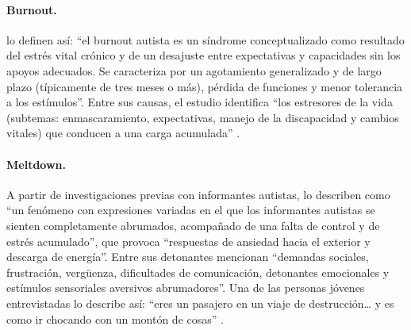\paragraph{Burnout.} \citet{raymaker2020} lo definen así: \enquote{el burnout autista es un síndrome conceptualizado como resultado del estrés vital crónico y de un desajuste entre expectativas y capacidades sin los apoyos adecuados. Se caracteriza por un agotamiento generalizado y de largo plazo (típicamente de tres meses o más), pérdida de funciones y menor tolerancia a los estímulos}. Entre sus causas, el estudio identifica \enquote{los estresores de la vida (subtemas: enmascaramiento, expectativas, manejo de la discapacidad y cambios vitales) que conducen a una carga acumulada} \citep{raymaker2020}.

\paragraph{Meltdown.} A partir de investigaciones previas con informantes autistas, \citet{phung2021} lo describen como \enquote{un fenómeno con expresiones variadas en el que los informantes autistas se sienten completamente abrumados, acompañado de una falta de control y de estrés acumulado}, que provoca \enquote{respuestas de ansiedad hacia el exterior y descarga de energía}. Entre sus detonantes mencionan \enquote{demandas sociales, frustración, vergüenza, dificultades de comunicación, detonantes emocionales y estímulos sensoriales aversivos abrumadores}. Una de las personas jóvenes entrevistadas lo describe así: \enquote{eres un pasajero en un viaje de destrucción… y es como ir chocando con un montón de cosas} \citep{phung2021}.

